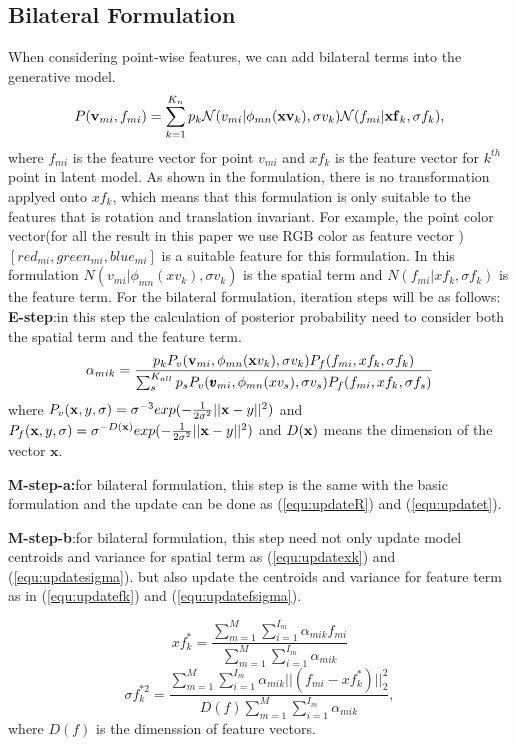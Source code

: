 \subsection{Bilateral Formulation}
When considering point-wise features, we can add bilateral terms into the generative model.
\begin{equation}
P(\mathbf{v}_{mi},f_{mi})=\sum^{K_n}_{k=1}p_k\mathcal{N}(v_{mi}|\phi_{mn}(\mathbf{xv}_k),\sigma v_k)\mathcal{N}(f_{mi}|\mathbf{xf}_k,\sigma f_k),
\end{equation}
where $f_{mi}$ is the feature vector for point $v_{mi}$ and $xf_k$ is the feature vector for $k^{th}$ point in latent model. As shown in the formulation, there is no transformation applyed onto $xf_k$, which means that this formulation is only suitable to the features that is rotation and translation invariant. For example, the point color vector(for all the result in this paper we use RGB color as feature vector ) $[red_{mi},green_{mi},blue_{mi}]$ is a suitable feature for this formulation. In this formulation $N(v_{mi}|\phi_{mn}(xv_k),\sigma v_k)$ is the spatial term and $N(f_{mi}|xf_k,\sigma f_k)$ is the feature term.
For the bilateral formulation, iteration steps will be as follows:\\
\textbf{E-step}:in this step the calculation of posterior probability need to consider both the spatial term and the feature term.
\begin{equation}
\label{equ:bestep}
\alpha_{mik}=\frac{p_kP_v( \mathbf{v}_{mi},\phi_{mn}(\mathbf{x}v_k),\sigma v_k)P_f(f_{mi},xf_k,\sigma f_k)}{\sum_s^{K_{all}}p_sP_v( \pmb v_{mi},\phi_{mn}(xv_s),\sigma v_s)P_f(f_{mi},xf_k,\sigma f_s)}
\end{equation}
where $P_v(\mathbf{x},y,\sigma)=\sigma^{-3}exp(-\frac{1}{2\sigma^2}||\mathbf{x}-y||^2)$ and $P_f(\mathbf{x},y,\sigma)=\sigma^{-D(\mathbf{x})}exp(-\frac{1}{2\sigma^2}||\mathbf{x}-y||^2)$ and $D(\mathbf{x})$ means the dimension of the vector $\pmb x$. 




\textbf{M-step-a:}for bilateral formulation, this step is the same with the basic formulation and the update can be done as (\ref{equ:updateR}) and (\ref{equ:updatet}).

\textbf{M-step-b}:for bilateral formulation, this step need not only update model centroids and variance for spatial term as (\ref{equ:updatexk}) and (\ref{equ:updatesigma}).
but also update the centroids and variance for feature term as in (\ref{equ:updatefk}) and (\ref{equ:updatefsigma}).

\begin{equation}
\label{equ:updatefk}
xf_k^*=\frac{\sum_{m=1}^M\sum_{i=1}^{I_m}\alpha_{mik}f_{mi}}{\sum_{m=1}^M\sum_{i=1}^{I_m}\alpha_{mik}}
\end{equation}
\begin{equation}
\label{equ:updatefsigma}
\sigma f_k^{*2}=\frac{\sum_{m=1}^M\sum_{i=1}^{I_m}\alpha_{mik}||(f_{mi}-xf_k^*)||_2^2}{D(f)\sum_{m=1}^M\sum_{i=1}^{I_m}\alpha_{mik}},
\end{equation}
where $D(f)$ is the dimenssion of feature vectors.



